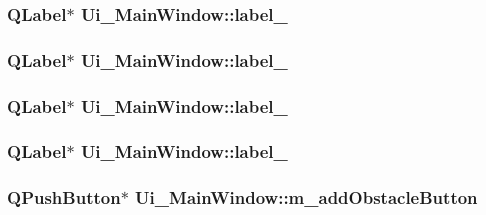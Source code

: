 \label{classUi__MainWindow_ad6bab8fb8903b8f41afea1218ee52695}
\hypertarget{classUi__MainWindow_a663f728e6244926a795c6e6892673b1d}{
\subsubsection[{label\_\-6}]{\setlength{\rightskip}{0pt plus 5cm}QLabel$\ast$ {\bf Ui\_\-MainWindow::label\_}}}
\label{classUi__MainWindow_a663f728e6244926a795c6e6892673b1d}
\hypertarget{classUi__MainWindow_a13936e6f18b1c90402b3c7a3c92b6cdb}{
\subsubsection[{label\_\-7}]{\setlength{\rightskip}{0pt plus 5cm}QLabel$\ast$ {\bf Ui\_\-MainWindow::label\_}}}
\label{classUi__MainWindow_a13936e6f18b1c90402b3c7a3c92b6cdb}
\hypertarget{classUi__MainWindow_af183bfbfb9f38bbdd60caf92b15e23dc}{
\subsubsection[{label\_\-8}]{\setlength{\rightskip}{0pt plus 5cm}QLabel$\ast$ {\bf Ui\_\-MainWindow::label\_}}}
\label{classUi__MainWindow_af183bfbfb9f38bbdd60caf92b15e23dc}
\hypertarget{classUi__MainWindow_a0e90c7e9ad77386881e0b264ddb9dd22}{
\subsubsection[{label\_\-9}]{\setlength{\rightskip}{0pt plus 5cm}QLabel$\ast$ {\bf Ui\_\-MainWindow::label\_}}}
\label{classUi__MainWindow_a0e90c7e9ad77386881e0b264ddb9dd22}
\hypertarget{classUi__MainWindow_acec2335350b2a00960d8f6dc7a59a2a4}{
\subsubsection[{m\_\-addObstacleButton}]{\setlength{\rightskip}{0pt plus 5cm}QPushButton$\ast$ {\bf Ui\_\-MainWindow::m\_\-addObstacleButton}}}
